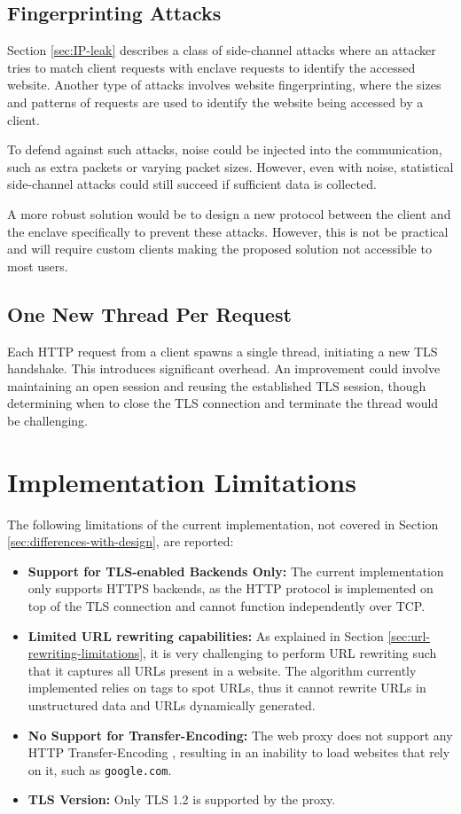 \subsection{Fingerprinting Attacks} \label{sec:fingerprinting-attacks}
Section \ref{sec:IP-leak} describes a class of side-channel attacks where an attacker tries to match client requests with enclave requests to identify the accessed website. Another type of attacks involves website fingerprinting, where the sizes and patterns of requests are used to identify the website being accessed by a client.

To defend against such attacks, noise could be injected into the communication, such as extra packets or varying packet sizes. However, even with noise, statistical side-channel attacks could still succeed if sufficient data is collected.

A more robust solution would be to design a new protocol between the client and the enclave specifically to prevent these attacks. However, this is not be practical and will require custom clients making the proposed solution not accessible to most users.

\subsection{One New Thread Per Request} 
Each HTTP request from a client spawns a single thread, initiating a new TLS handshake. This introduces significant overhead. An improvement could involve maintaining an open session and reusing the established TLS session, though determining when to close the TLS connection and terminate the thread would be challenging.

\section{Implementation Limitations}
The following limitations of the current implementation, not covered in Section \ref{sec:differences-with-design}, are reported:
\begin{itemize}
    \item \textbf{Support for TLS-enabled Backends Only:} The current implementation only supports HTTPS backends, as the HTTP protocol is implemented on top of the TLS connection and cannot function independently over TCP.
    \item \textbf{Limited URL rewriting capabilities:} As explained in Section \ref{sec:url-rewriting-limitations}, it is very challenging to perform URL rewriting such that it captures all URLs present in a website. The algorithm currently implemented relies on tags to spot URLs, thus it cannot rewrite URLs in unstructured data and URLs dynamically generated.
    \item \textbf{No Support for Transfer-Encoding:} The web proxy does not support any HTTP Transfer-Encoding \cite{http-transfer-encoding}, resulting in an inability to load websites that rely on it, such as \texttt{google.com}.
    \item \textbf{TLS Version:} Only TLS 1.2 is supported by the proxy.
\end{itemize}

